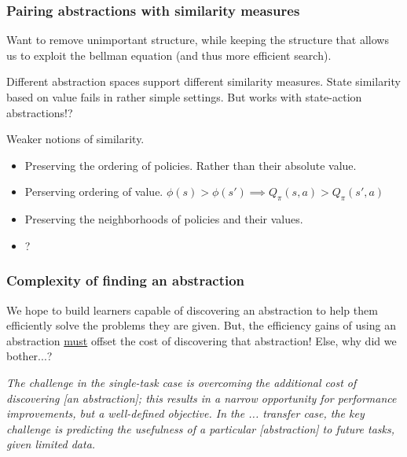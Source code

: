 
\subsubsection{Pairing abstractions with similarity measures}

Want to remove unimportant structure, while keeping the structure that allows us
to exploit the bellman equation (and thus more efficient search).

Different abstraction spaces support different similarity measures.
State similarity based on value fails in rather simple settings.
But works with state-action abstractions!?

Weaker notions of similarity.
\begin{itemize}
\tightlist
  \item Preserving the ordering of policies. Rather than their absolute value.
  \item Perserving ordering of value. $\phi(s) > \phi(s') \implies Q_{\pi}(s, a) > Q_{\pi}(s', a)$
  \item Preserving the neighborhoods of policies and their values.
  \item ?
\end{itemize}

\subsubsection{Complexity of finding an abstraction}

We hope to build learners capable of discovering an abstraction to help them efficiently solve the problems they are given.
But, the efficiency gains of using an abstraction \underline{must} offset the cost of
discovering that abstraction! Else, why did we bother...?

\begin{displayquote}
\textit{The challenge in the single-task case is overcoming the additional cost of discovering [an abstraction];
this results in a narrow opportunity for performance improvements, but a well-defined objective.
In the ... transfer case, the key challenge is predicting the usefulness of a particular [abstraction] to future tasks, given limited data.}\cite{Konidaris2019}
\end{displayquote}

